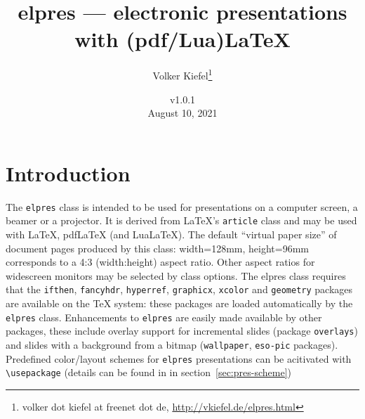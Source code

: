 \documentclass[11pt,a4paper]{article}
\title{\textsf{elpres} --- electronic presentations \\ with (pdf/Lua)\LaTeX}
\author{Volker Kiefel\thanks{volker dot kiefel at freenet dot de, 
       \url{http://vkiefel.de/elpres.html}}}
\date{v1.0.1\\[1.8ex]
  August 10, 2021%
}
\begin{document}
\maketitle
\thispagestyle{empty}

\tableofcontents




\section{Introduction}

\label{sec:Introduction}

The \texttt{elpres} class is intended to be used for
presentations on a computer screen, a
beamer or a projector. It is derived from \LaTeX's \texttt{article} class and
may be used with \LaTeX{}, pdf\LaTeX{} (and Lua\LaTeX ).
The default ``virtual paper size'' of document pages produced by this class:
width=128mm, height=96mm corresponds to a 4:3 (width:height) aspect
ratio.
%
%
Other aspect ratios for widescreen monitors may be selected by class
options.
The \textsf{elpres} class requires that the \texttt{ifthen},
\texttt{fancyhdr},
\texttt{hyperref},
\texttt{graphicx},
\texttt{xcolor}
and \texttt{geometry} packages are available on the \TeX{} system: these
packages are loaded automatically by the \texttt{elpres} class.
Enhancements to \texttt{elpres} are easily made available by other packages,
these include overlay support for incremental slides (package
\texttt{overlays})  and slides
with a background from a bitmap (\texttt{wallpaper}, \texttt{eso-pic}
packages). Predefined color/layout schemes for \texttt{elpres} presentations
can be acitivated with
\verb+\usepackage+ (details can be found in
in section~\ref{sec:pres-scheme})
\end{document}
